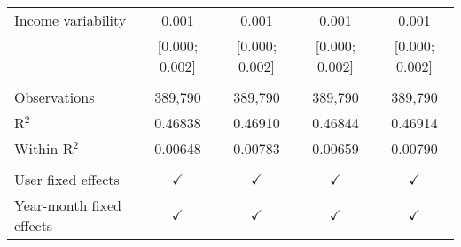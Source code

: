 \begin{tabular}{lcccc}
   Income variability                     & 0.001          & 0.001           & 0.001            & 0.001\\   
                                          & [0.000; 0.002] & [0.000; 0.002]  & [0.000; 0.002]   & [0.000; 0.002]\\   
    \\
   Observations                           & 389,790        & 389,790         & 389,790          & 389,790\\  
   R$^2$                                  & 0.46838        & 0.46910         & 0.46844          & 0.46914\\  
   Within R$^2$                           & 0.00648        & 0.00783         & 0.00659          & 0.00790\\  
    \\
   User fixed effects                     & $\checkmark$   & $\checkmark$    & $\checkmark$     & $\checkmark$\\   
   Year-month fixed effects               & $\checkmark$   & $\checkmark$    & $\checkmark$     & $\checkmark$\\   
   \bottomrule
\end{tabular}
\par\endgroup


